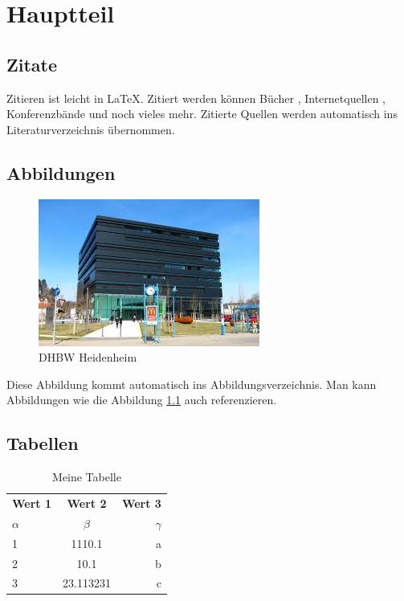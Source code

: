 \chapter{Hauptteil}

\blindtext

\section{Zitate}

Zitieren ist leicht in \LaTeX{}. Zitiert werden können Bücher \cite{fitzgerald:realigning_research_and_practice}, Internetquellen \cite{stallman99:telepolis}, Konferenzbände \cite{raymond:cathedral_bazaar_book} und noch vieles mehr. Zitierte Quellen werden automatisch ins Literaturverzeichnis übernommen.

\section{Abbildungen}

\begin{figure}[H]
	\centering
	\includegraphics[keepaspectratio]{./bilder/dhbw.jpg}
	\caption{DHBW Heidenheim}
	\label{dhbwhdh}
\end{figure}

Diese Abbildung kommt automatisch ins Abbildungsverzeichnis. Man kann Abbildungen wie die Abbildung \ref{dhbwhdh} auch referenzieren.

\section{Tabellen}

\begin{table}[H]
	\begin{center}
		\begin{tabular}{l|c|r}
			\toprule
			\textbf{Wert 1} & \textbf{Wert 2} & \textbf{Wert 3}\\
			$\alpha$ & $\beta$ & $\gamma$ \\
			\midrule
			1 & 1110.1 & a\\
			2 & 10.1 & b\\
			3 & 23.113231 & c\\
			\bottomrule
		\end{tabular}
	\caption{Meine Tabelle}
	\label{tabelle}
	\end{center}
\end{table}

